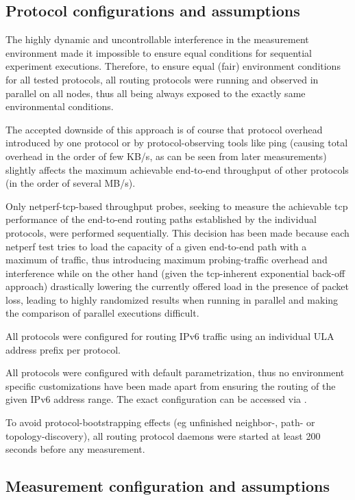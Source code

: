 \documentclass[a4paper,12pt,twoside]{article}
\begin{document}
\subsection{Protocol configurations and assumptions}
The highly dynamic and uncontrollable interference in the measurement
environment made it impossible to ensure equal conditions for
sequential experiment executions. Therefore, to ensure equal (fair)
environment conditions for all tested protocols, all routing protocols
were running and observed in parallel on all nodes, thus all being
always exposed to the exactly same environmental conditions. 

The accepted downside of this approach is of course that protocol
overhead introduced by one protocol or by protocol-observing tools
like ping (causing total overhead in the order of few KB/s, as can be
seen from later measurements) slightly affects the maximum achievable
end-to-end throughput of other protocols (in the order of several
MB/s).

Only netperf-tcp-based throughput probes, seeking to measure the
achievable tcp performance of the end-to-end routing paths established
by the individual protocols, were performed sequentially. This
decision has been made because each netperf test tries to load the
capacity of a given end-to-end path with a maximum of traffic, thus
introducing maximum probing-traffic overhead and interference while on
the other hand (given the tcp-inherent exponential back-off approach)
drastically lowering the currently offered load in the presence of
packet loss, leading to highly randomized results when running in
parallel and making the comparison of parallel executions difficult.


All protocols were configured for routing IPv6 traffic using an
individual ULA address prefix per protocol. 

All protocols were configured with default parametrization, thus no
environment specific customizations have been made apart from ensuring
the routing of the given IPv6 address range. The exact configuration
can be accessed via \cite{wbm-config}.

To avoid protocol-bootstrapping effects (eg unfinished neighbor-,
path- or topology-discovery), all routing protocol daemons were
started at least 200 seconds before any measurement.

\subsection{Measurement configuration and assumptions}
\label{measurement-config}
\end{document}
